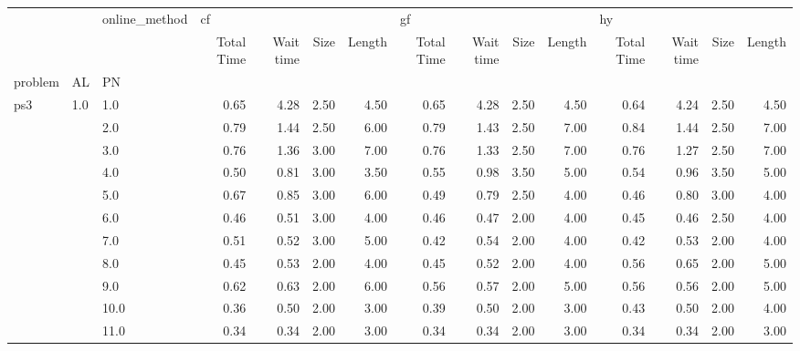 \begin{tabular}{lllrrrrrrrrrrrr}
\toprule
      &     & online\_method & \multicolumn{4}{l}{cf} & \multicolumn{4}{l}{gf} & \multicolumn{4}{l}{hy} \\
      &     & {} & Total Time & Wait time & Size & Length & Total Time & Wait time & Size & Length & Total Time & Wait time & Size & Length \\
problem & AL & PN &            &           &      &        &            &           &      &        &            &           &      &        \\
\midrule
ps3 & 1.0 & 1.0  &       0.65 &      4.28 & 2.50 &   4.50 &       0.65 &      4.28 & 2.50 &   4.50 &       0.64 &      4.24 & 2.50 &   4.50 \\
      &     & 2.0  &       0.79 &      1.44 & 2.50 &   6.00 &       0.79 &      1.43 & 2.50 &   7.00 &       0.84 &      1.44 & 2.50 &   7.00 \\
      &     & 3.0  &       0.76 &      1.36 & 3.00 &   7.00 &       0.76 &      1.33 & 2.50 &   7.00 &       0.76 &      1.27 & 2.50 &   7.00 \\
      &     & 4.0  &       0.50 &      0.81 & 3.00 &   3.50 &       0.55 &      0.98 & 3.50 &   5.00 &       0.54 &      0.96 & 3.50 &   5.00 \\
      &     & 5.0  &       0.67 &      0.85 & 3.00 &   6.00 &       0.49 &      0.79 & 2.50 &   4.00 &       0.46 &      0.80 & 3.00 &   4.00 \\
      &     & 6.0  &       0.46 &      0.51 & 3.00 &   4.00 &       0.46 &      0.47 & 2.00 &   4.00 &       0.45 &      0.46 & 2.50 &   4.00 \\
      &     & 7.0  &       0.51 &      0.52 & 3.00 &   5.00 &       0.42 &      0.54 & 2.00 &   4.00 &       0.42 &      0.53 & 2.00 &   4.00 \\
      &     & 8.0  &       0.45 &      0.53 & 2.00 &   4.00 &       0.45 &      0.52 & 2.00 &   4.00 &       0.56 &      0.65 & 2.00 &   5.00 \\
      &     & 9.0  &       0.62 &      0.63 & 2.00 &   6.00 &       0.56 &      0.57 & 2.00 &   5.00 &       0.56 &      0.56 & 2.00 &   5.00 \\
      &     & 10.0 &       0.36 &      0.50 & 2.00 &   3.00 &       0.39 &      0.50 & 2.00 &   3.00 &       0.43 &      0.50 & 2.00 &   4.00 \\
      &     & 11.0 &       0.34 &      0.34 & 2.00 &   3.00 &       0.34 &      0.34 & 2.00 &   3.00 &       0.34 &      0.34 & 2.00 &   3.00 \\

\end{tabular}
